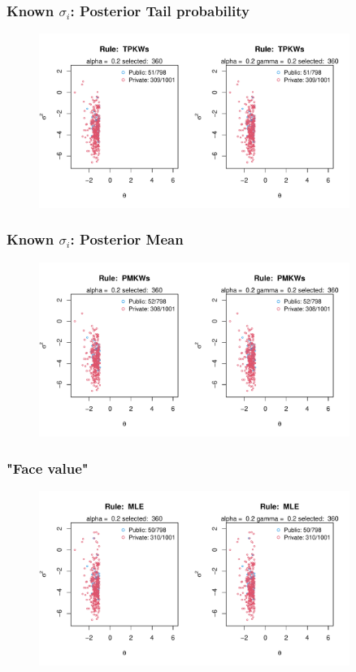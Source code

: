 \documentclass[10pt,mathserif,aspectratio=169]{beamer}
\begin{document}
\begin{frame}[label=tpselect]
  \frametitle{Known $\sigma_i$: Posterior Tail probability}
  \begin{figure}
    \centering
    \includegraphics[width=0.9\textwidth]{../../Figures/2013-2022/GMM_m/GLmix/Left_0.2_0.2_TPKWs.pdf}
  \end{figure}
  \hyperlink{tpcontour}{}
\end{frame}

\begin{frame}
  \frametitle{Known $\sigma_i$: Posterior Mean}
  \begin{figure}
    \centering
    \includegraphics[width=0.9\textwidth]{../../Figures/2013-2022/GMM_m/GLmix/Left_0.2_0.2_PMKWs.pdf}
  \end{figure}
\end{frame}

\begin{frame}
  \frametitle{"Face value"}
  \begin{figure}
    \centering
    \includegraphics[width=0.9\textwidth]{../../Figures/2013-2022/GMM_m/GLmix/Left_0.2_0.2_MLE.pdf}
  \end{figure}
\end{frame}
\end{document}
